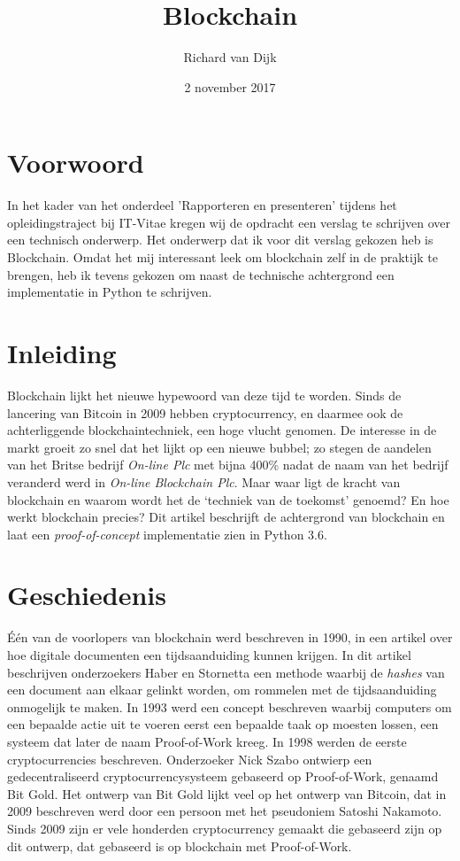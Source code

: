 \documentclass{article}
\title{Blockchain}
\date{2 november 2017}
\author{Richard van Dijk}
\begin{document}
\maketitle
\newpage

\newpage
\tableofcontents
\newpage
{}
\setcounter{page}{1}

\section{Voorwoord}
In het kader van het onderdeel 'Rapporteren en presenteren' tijdens het opleidingstraject bij IT-Vitae kregen wij de opdracht een verslag te schrijven over een technisch onderwerp. Het onderwerp dat ik voor dit verslag gekozen heb is Blockchain. Omdat het mij interessant leek om blockchain zelf in de praktijk te brengen, heb ik tevens gekozen om naast de technische achtergrond een implementatie in Python te schrijven.
\newpage
\section{Inleiding}
Blockchain lijkt het nieuwe hypewoord van deze tijd te worden. Sinds de lancering van Bitcoin in 2009 hebben cryptocurrency, en daarmee ook de achterliggende blockchaintechniek, een hoge vlucht genomen. De interesse in de markt groeit zo snel dat het lijkt op een nieuwe bubbel; zo stegen de aandelen van het Britse bedrijf \textit{On-line Plc} met bijna 400\% nadat de naam van het bedrijf veranderd werd in \textit{On-line Blockchain Plc}. Maar waar ligt de kracht van blockchain en waarom wordt het de `techniek van de toekomst' genoemd? En hoe werkt blockchain precies? Dit artikel beschrijft de achtergrond van blockchain en laat een \textit{proof-of-concept} implementatie zien in Python 3.6.

\section{Geschiedenis}
Één van de voorlopers van blockchain werd beschreven in 1990, in een artikel over hoe digitale documenten een tijdsaanduiding kunnen krijgen. In dit artikel beschrijven onderzoekers Haber en Stornetta een methode waarbij de \textit{hashes} van een document aan elkaar gelinkt worden, om rommelen met de tijdsaanduiding onmogelijk te maken. In 1993 werd een concept beschreven waarbij computers om een bepaalde actie uit te voeren eerst een bepaalde taak op moesten lossen, een systeem dat later de naam Proof-of-Work kreeg. In 1998 werden de eerste cryptocurrencies beschreven. Onderzoeker Nick Szabo ontwierp een gedecentraliseerd cryptocurrencysysteem gebaseerd op Proof-of-Work, genaamd Bit Gold. Het ontwerp van Bit Gold lijkt veel op het ontwerp van Bitcoin, dat in 2009 beschreven werd door een persoon met het pseudoniem Satoshi Nakamoto. Sinds 2009 zijn er vele honderden cryptocurrency gemaakt die gebaseerd zijn op dit ontwerp, dat gebaseerd is op blockchain met Proof-of-Work.
\end{document}
